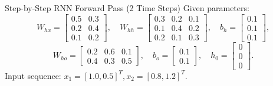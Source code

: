 \documentclass[a4paper,11pt]{article}
\begin{document}
\begin{worked}{Step-by-Step RNN Forward Pass (2 Time Steps)}
Given parameters:
$$W_{hx} = \begin{bmatrix} 0.5 & 0.3 \\ 0.2 & 0.4 \\ 0.1 & 0.2 \end{bmatrix}, \quad W_{hh} = \begin{bmatrix} 0.3 & 0.2 & 0.1 \\ 0.1 & 0.4 & 0.2 \\ 0.2 & 0.1 & 0.3 \end{bmatrix}, \quad b_h = \begin{bmatrix} 0.1 \\ 0.1 \\ 0.1 \end{bmatrix},$$
$$W_{ho} = \begin{bmatrix} 0.2 & 0.6 & 0.1 \\ 0.4 & 0.3 & 0.5 \end{bmatrix}, \quad b_o = \begin{bmatrix} 0.1 \\ 0.1 \end{bmatrix}, \quad h_0 = \begin{bmatrix} 0 \\ 0 \\ 0 \end{bmatrix}.$$
Input sequence: $x_1 = [1.0, 0.5]^T, x_2 = [0.8, 1.2]^T$.


\end{worked}
\end{document}
